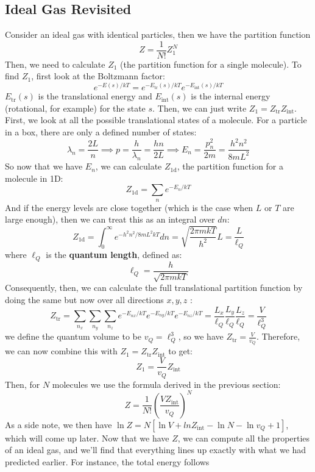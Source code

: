 \documentclass[10pt]{article}
\begin{document}
	\subsection{Ideal Gas Revisited}
	Consider an ideal gas with identical particles, then we have the partition function 
	\[
	Z = \frac{1}{N!} Z_1^{N}
	\] 
	Then, we need to calculate \( Z_1 \) (the partition function for a single molecule). To find \( Z_1 \), first look at the 
	Boltzmann factor:
	\[
	e^{-E(s) / kT} = e^{-E_{\text{tr}}(s) / kT} e^{-E_{\text{int}}(s) / kT}
	\] 
	\( E_{\text{tr}}(s) \) is the translational energy and \( E_{\text{int}}(s) \) is the internal energy (rotational, for 
	example) for the state \( s \). Then, we can just write \(  Z_1= Z_{\text{tr}}Z_{\text{int}} \). First, we look at all the 
	possible translational states of a molecule. For a particle in a box, there are only a defined number of states:
	\[
	\lambda_n = \frac{2L}{n} \implies p = \frac{h}{\lambda_n} = \frac{hn}{2L} \implies E_n = \frac{p_n^2}{2m} = \frac{h^2 n^2}{8mL^2}
	\] 
	So now that we have \( E_n \), we can calculate \( Z_{\text{1d}} \), the partition function for a molecule 
	in 1D:
	\[
	Z_{\text{1d}} = \sum_n e^{-E_n /kT}
	\] 
	And if the energy levels are close together (which is the case when \( L \) or \( T \) are large enough), then we can treat
	this as an integral over \( dn \):
	\[
	Z_{\text{1d}} = \int_0^{\infty} e^{-h^2 n^2/8 mL^2 kT} dn = \sqrt{\frac{2\pi m kT}{h^2}} L = \frac{L}{\ell_Q}
	\] 
	where \( \ell_Q \) is the \textbf{quantum length}, defined as:
	\[
	\ell_Q = \frac{h}{\sqrt{2 \pi m kT} }
	\] 
	Consequently, then, we can calculate the full translational partition function by doing the same but now over all 
	directions \( x, y, z \) :
	\[
	Z_{\text{tr}} = \sum_{n_x}\sum_{n_y}\sum_{n_z} e^{-E_{nx} / kT} e^{-E_{ny} / kT} e^{-E_{nz} / kT} = \frac{L_x}{\ell_Q} 
	\frac{L_y}{\ell_Q} \frac{L_z}{\ell_Q} = \frac{V}{\ell_Q^3}
	\] 
	we define the quantum volume to be \( v_Q = \ell_Q^3 \), so we have \( Z_{\text{tr}} = \frac{V}{v_Q} \). Therefore, we can 
	now combine this with \( Z_1 = Z_{\text{tr}}Z_{\text{int}} \) to get:
	\[
	Z_1 = \frac{V}{v_Q} Z_{\text{int}}
	\] 
	Then, for \( N \) molecules we use the formula derived in the previous section:
	\[
	Z = \frac{1}{N!}\left( \frac{VZ_{\text{int}}}{v_Q} \right) ^{N}
	\] 
	As a side note, we then have \( \ln Z = N[\ln V + ln Z_{\text{int}} - \ln N - \ln v_Q + 1] \), which will come 
	up later. Now that we have \( Z \), we can compute all the properties of an ideal gas, and we'll find that 
	everything lines up exactly with what we had predicted earlier. For instance, the total energy follows 
\end{document}
